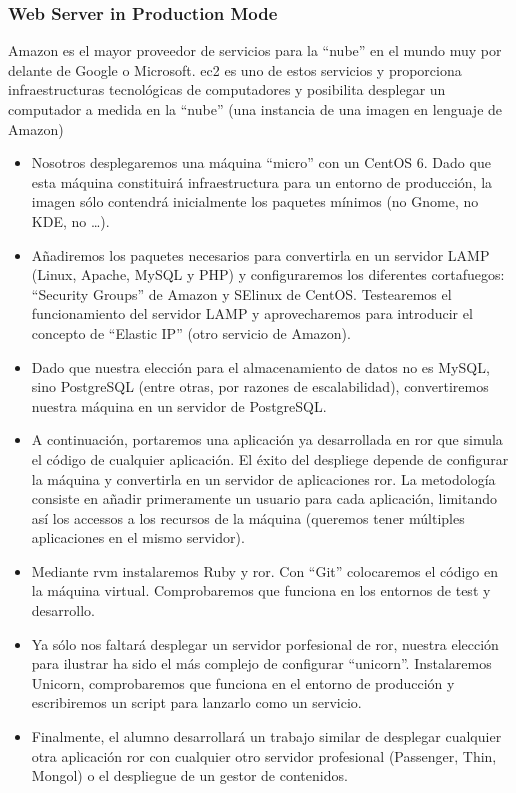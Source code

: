 \documentclass{beamer}
\begin{document}
\begin{frame}
\frametitle{Web Server in Production Mode}
Amazon es el mayor proveedor de servicios para la ``nube'' en el mundo muy por delante de Google o Microsoft.
\acrfull{ec2} es uno de estos servicios y proporciona infraestructuras tecnológicas de computadores y posibilita
desplegar un computador a medida en la ``nube'' (una instancia de una imagen en lenguaje de Amazon)

\begin{itemize}
\item Nosotros desplegaremos una máquina ``micro'' con un CentOS 6.
Dado que esta máquina constituirá infraestructura para un entorno de producción, la imagen sólo contendrá inicialmente los paquetes mínimos (no Gnome, no KDE, no \dots).

\item Añadiremos los paquetes necesarios para convertirla en un servidor LAMP (Linux, Apache, MySQL y PHP) y configuraremos los diferentes cortafuegos: ``Security Groups'' de Amazon y SElinux de CentOS.
Testearemos el funcionamiento del servidor LAMP y aprovecharemos para introducir el concepto de ``Elastic IP'' (otro servicio de Amazon).

\item Dado que nuestra elección para el almacenamiento de datos no es MySQL, sino PostgreSQL (entre otras, por  razones de escalabilidad), convertiremos nuestra máquina en un servidor de PostgreSQL.

\item A continuación, portaremos una aplicación ya desarrollada en \acrfull{ror} que simula el código de cualquier aplicación. El éxito del despliege depende de configurar la máquina y convertirla en un servidor de aplicaciones \acrshort{ror}.
La metodología consiste en añadir primeramente un usuario para cada aplicación, limitando así los accessos a los recursos de la máquina (queremos tener múltiples aplicaciones en el mismo servidor).

\item Mediante \acrfull{rvm} instalaremos Ruby y \acrshort{ror}. Con ``Git''  colocaremos el código en la máquina virtual. Comprobaremos que funciona en los entornos de test y desarrollo.

\item Ya sólo nos faltará desplegar  un servidor porfesional de \acrshort{ror}, nuestra elección para ilustrar ha sido el más complejo de configurar ``unicorn''. Instalaremos Unicorn, comprobaremos que funciona en el entorno de producción y escribiremos un script para lanzarlo como un servicio.

\item Finalmente, el alumno desarrollará un trabajo similar de desplegar cualquier otra aplicación \acrshort{ror} con cualquier otro servidor profesional (Passenger, Thin, Mongol) o el despliegue de un gestor de contenidos.

\end{itemize}
\end{frame}
\end{document}
